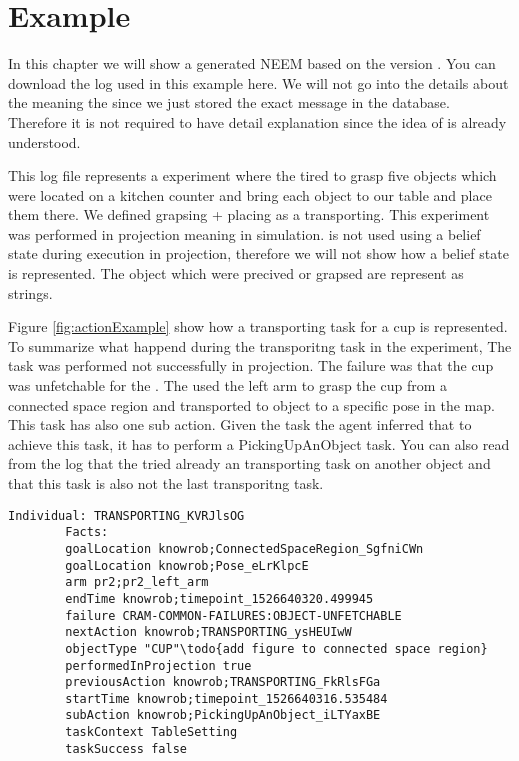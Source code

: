 \chapter{Example}
	\label{ch:example}
	In this chapter we will show a generated NEEM based on the version \neemversion.
	You can download the log used in this example here.	
	We will not go into the details about the \neemexp meaning the \tf since we just stored the exact \tf message in the database.
	Therefore it is not required to have detail explanation since the idea of \tf is already understood.
	
	This log file represents a experiment where the \pr tired to grasp five objects which were located on a kitchen counter and bring each object to our table and place them there.
	We defined grapsing + placing as a transporting.
	This experiment was performed in projection meaning in simulation.
	\cram is not used using a belief state during execution in projection, therefore we will not show how a belief state is represented.
	The object which were precived or grapsed are represent as strings.
	
	Figure \ref{fig:actionExample} show how a transporting task for a cup is represented.
	To summarize what happend during the transporitng task in the experiment,
	The task was performed not successfully in projection. 
	The failure was that the cup was unfetchable for the \pr.
	The \pr used the left arm to grasp the cup from a connected space region and transported to object to a specific pose in the map.
	This task has also one sub action. 
	Given the task the agent inferred that to achieve this task, it has to perform a PickingUpAnObject task.
	You can also read from the log that the  tried already an transporting task on another object and that this task is also not the last transporitng task.
	
	\begin{minipage}{\textwidth}
		\scriptsize
		\begin{lstlisting}[frame=single]
		Individual: TRANSPORTING_KVRJlsOG
		Facts: 
		goalLocation knowrob;ConnectedSpaceRegion_SgfniCWn
		goalLocation knowrob;Pose_eLrKlpcE
		arm pr2;pr2_left_arm
		endTime knowrob;timepoint_1526640320.499945
		failure CRAM-COMMON-FAILURES:OBJECT-UNFETCHABLE
		nextAction knowrob;TRANSPORTING_ysHEUIwW
		objectType "CUP"\todo{add figure to connected space region}
		performedInProjection true
		previousAction knowrob;TRANSPORTING_FkRlsFGa
		startTime knowrob;timepoint_1526640316.535484
		subAction knowrob;PickingUpAnObject_iLTYaxBE
		taskContext TableSetting
		taskSuccess false
		\end{lstlisting}

		\label{fig:actionExample}
	\end{minipage}
			\vspace{0.5mm}	
	
